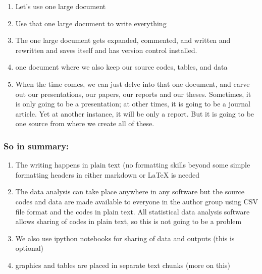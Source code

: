 \begin{enumerate}
\item Let's use one large document
\item Use that one large document to write everything
\item The one large document gets expanded, commented, and written and rewritten and saves itself and has version control installed.
\item one document where we also keep our source codes, tables, and data
\item When the time comes, we can just delve into that one document, and carve out our presentations, our papers, our reports and our theses. Sometimes, it is only going to be a presentation; at other times, it is going to be a journal article. Yet at another instance, it will be only a report. But it is going to be one source from where we create all of these. 
\end{enumerate}

\subsubsection{So in summary:}

\begin{enumerate}
\item The writing happens in plain text (no formatting skills beyond some simple formatting headers in either markdown or LaTeX is needed
\item The data analysis can take place anywhere in any software but the source codes and data are made available to everyone in the author group using CSV file format and the codes in plain text. All statistical data analysis software allows sharing of codes in plain text, so this is not going to be a problem
\item We also use ipython notebooks for sharing of data and outputs (this is optional)
\item graphics and tables are placed in separate text chunks (more on this)
\end{enumerate}


    
    
    